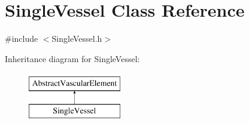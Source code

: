 \hypertarget{class_single_vessel}{}\section{Single\+Vessel Class Reference}
\label{class_single_vessel}


{\ttfamily \#include $<$Single\+Vessel.\+h$>$}

Inheritance diagram for Single\+Vessel\+:\begin{figure}[H]
\begin{center}
\leavevmode
\includegraphics[height=2.000000cm]{da/d40/class_single_vessel}
\end{center}
\end{figure}
